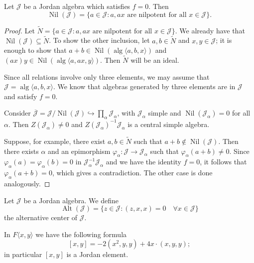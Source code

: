 \documentclass{article}
\begin{document}
\begin{lemma}
Let $\mathcal{J}$ be a Jordan algebra which satisfies $f=0$. Then
\[
\operatorname{Nil}(\mathcal{J})=\{a \in \mathcal{J}: a, ax \text{ are nilpotent for all } x \in \mathcal{J}\}.
\]
\end{lemma}

\begin{proof}
Let $\widetilde{N}=\{a \in \mathcal{J}: a, ax \text{ are nilpotent for all } x \in \mathcal{J}\}$. We already have that $\operatorname{Nil}(\mathcal{J}) \subseteq \widetilde{N}$. To show the other inclusion, let $a,b \in \widetilde{N}$ and $x,y \in \mathcal{J}$; it is enough to show that $a+b \in \operatorname{Nil}(\operatorname{alg}\langle a,b,x\rangle)$ and $(ax)y \in \operatorname{Nil}(\operatorname{alg}\langle a,ax,y\rangle)$. Then $\widetilde{N}$ will be an ideal.

Since all relations involve only three elements, we may assume that $\mathcal{J}=\operatorname{alg}\langle a,b,x\rangle$. We know that algebras generated by three elements are in $\mathcal{J}$ and satisfy $f=0$.

Consider $\overline{\mathcal{J}}=\mathcal{J}/\operatorname{Nil}(\mathcal{J}) \hookrightarrow \prod_\alpha \mathcal{J}_\alpha$, with $\mathcal{J}_\alpha$ simple and $\operatorname{Nil}(\mathcal{J}_\alpha)=0$ for all $\alpha$. Then $Z(\mathcal{J}_\alpha)\neq0$ and $Z(\mathcal{J}_\alpha)^{-1}\mathcal{J}_\alpha$ is a central simple algebra.

Suppose, for example, there exist $a,b \in \widetilde{N}$ such that $a+b \notin \operatorname{Nil}(\mathcal{J})$. Then there exists $\alpha$ and an epimorphism $\varphi_\alpha:\mathcal{J} \to \mathcal{J}_\alpha$ such that $\varphi_\alpha(a+b)\neq0$. Since $\varphi_\alpha(a)=\varphi_\alpha(b)=0$ in $\mathcal{J}_\alpha^{-1}\mathcal{J}_\alpha$ and we have the identity $f=0$, it follows that $\varphi_\alpha(a+b)=0$, which gives a contradiction. The other case is done analogously.
\end{proof}

\begin{definition}
Let $\mathcal{J}$ be a Jordan algebra. We define
\[
\operatorname{Alt}(\mathcal{J})=\{z \in \mathcal{J}:(z,x,x)=0 \quad \forall x \in \mathcal{J}\}
\]
the alternative center of $\mathcal{J}$.
\end{definition}

In $F\langle x,y\rangle$ we have the following formula
\[
[x,y]=-2(x^2,y,y)+4x\cdot(x,y,y);
\]
in particular $[x,y]$ is a Jordan element.
\end{document}
